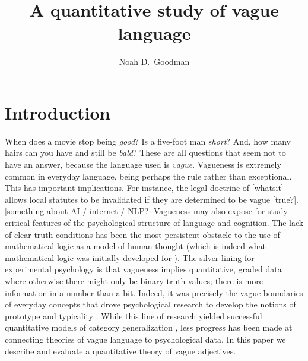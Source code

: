 \documentclass[11pt]{amsart}
\title{A quantitative study of vague language}
\author{Noah D.~Goodman}
\newcommand{\ndg}[1]{{\color{ForestGreen}[#1]}}
\begin{document}
\maketitle

\section{Introduction}

When does a movie stop being \emph{good}?
Is a five-foot man \emph{short}? 
And, how many hairs can you have and still be \emph{bald}?
These are all questions that seem not to have an answer, because the language used is \emph{vague}.
Vagueness is extremely common in everyday language, being perhaps the rule rather than exceptional.
This has important implications. 
For instance, the legal doctrine of \ndg{whatsit} allows local statutes to be invalidated if they are determined to be vague \ndg{true?}.
\ndg{something about AI / internet / NLP?}
%
Vagueness may also expose for study critical features of the psychological structure of language and cognition.
The lack of clear truth-conditions has been the most persistent obstacle to the use of mathematical logic as a model of human thought (which is indeed what mathematical logic was initially developed for \cite{bool}).
The silver lining for experimental psychology is that vagueness implies quantitative, graded data where otherwise there might only be binary truth values; there is more information in a number than a bit. 
Indeed, it was precisely the vague boundaries of everyday concepts that drove psychological research to develop the notions of prototype and typicality \cite{rosch}.
While this line of research yielded successful quantitative models of category generalization \cite{GCM,RR, ..}, less progress has been made at connecting theories of vague language to psychological data.
In this paper we describe and evaluate a quantitative theory of vague adjectives. 
\end{document}
